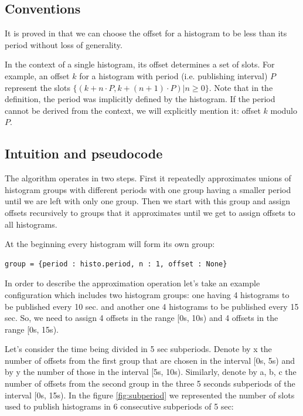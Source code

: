 \subsection{Conventions}

It is proved in \citep{goossens2003scheduling} that we can choose the offset for a histogram to be less than its period without loss of generality. 

In the context of a single histogram, its offset determines a set of slots. For example, an offset $k$ for a histogram with period (i.e. publishing interval) $P$ represent the slots $\{(k+n\cdot P, k+(n+1)\cdot P) | n \geq 0\}$. Note that in the definition, the period was implicitly defined by the histogram. If the period cannot be derived from the context, we will explicitly mention it: offset $k$ modulo $P$.

\subsection{Intuition and pseudocode}

The algorithm operates in two steps. First it repeatedly approximates unions of histogram groups with different periods with one group having a smaller period until we are left with only one group. Then we start with this group and assign offsets recursively to groups that it approximates until we get to assign offsets to all histograms.

At the beginning every histogram will form its own group:
\begin{verbatim}
group = {period : histo.period, n : 1, offset : None}
\end{verbatim}
In order to describe the approximation operation let’s take an example configuration which includes two histogram groups: one having 4 histograms to be published every 10 sec. and another one 4 histograms to be published every 15 sec. So, we need to assign 4 offsets in the range [0s, 10s) and 4 offsets in the range [0s, 15s).
 
Let’s consider the time being divided in 5 sec subperiods. Denote by x the number of offsets from the first group that are chosen in the interval [0s, 5s) and by y the number of those in the interval [5s, 10s). Similarly, denote by a, b, c the number of offsets from the second group in the three 5 seconds subperiods of the interval [0s, 15s). In the figure \ref{fig:subperiod} we represented the number of slots used to publish histograms in 6 consecutive subperiods of 5 sec:

